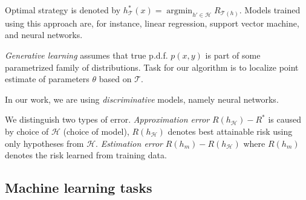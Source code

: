 Optimal strategy is denoted by $h_{\mathcal{T}}^*(x)=\operatorname*{argmin}_{{h}'\in \mathcal{H}}R_{\mathcal{T}(h)}$. Models trained using this approach are, for instance, linear regression, support vector machine, and neural networks.

\emph{Generative learning} assumes that true p.d.f. $p(x,y)$ is part of some parametrized family of distributions. Task for our algorithm is to localize point estimate of parameters $\theta$ based on $\mathcal{T}$.

In our work, we are using \emph{discriminative} models, namely neural networks.


We distinguish two types of error. \emph{Approximation error} $R(h_{\mathcal{H}})-R^*$  is caused by choice of $\mathcal{H}$ (choice of model), $R(h_{\mathcal{H}})$ denotes best attainable risk using only hypotheses from $\mathcal{H}$. \emph{Estimation error} $R(h_{m})-R(h_{\mathcal{H}})$ where $R(h_{m})$ denotes the risk learned from training data.


\subsection{Machine learning tasks}
